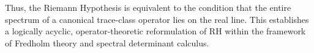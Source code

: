 \begin{theorem}
\medskip

\noindent
Thus, the Riemann Hypothesis is equivalent to the condition that the entire spectrum of a canonical trace-class operator lies on the real line. This establishes a logically acyclic, operator-theoretic reformulation of RH within the framework of Fredholm theory and spectral determinant calculus.
\end{theorem}
